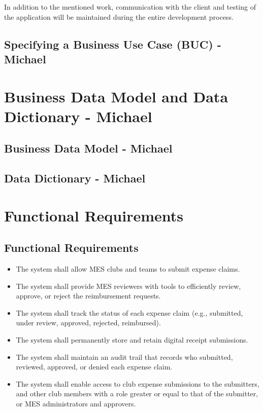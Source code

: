 \documentclass[12pt]{article}
\begin{document}
    In addition to the mentioned work, communication with the client and testing of the application will be maintained during the entire development process.
  \subsection{Specifying a Business Use Case (BUC) - Michael}


\section{Business Data Model and Data Dictionary - Michael}
  \subsection{Business Data Model - Michael}
  \subsection{Data Dictionary - Michael}

\section{Functional Requirements}
  \subsection{Functional Requirements}
    \begin{itemize}
      \item The system shall allow MES clubs and teams to submit expense claims.
      \item The system shall provide MES reviewers with tools to efficiently review, approve, or reject the reimbursement requests.
      \item The system shall track the status of each expense claim (e.g., submitted, under review, approved, rejected, reimbursed).
      \item The system shall permanently store and retain digital receipt submissions.
      \item The system shall maintain an audit trail that records who submitted, reviewed, approved, or denied each expense claim.
      \item The system shall enable access to club expense submissions to the submitters, and other club members with a role greater or equal to that of the submitter, or MES administrators and approvers.
    \end{itemize}
\end{document}
